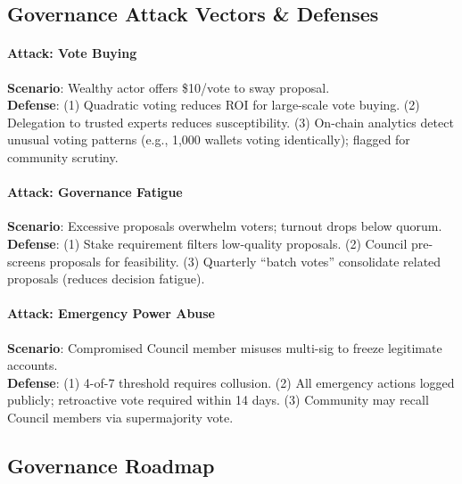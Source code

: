 \documentclass[11pt]{article}
\begin{document}
\begin{itemize}[noitemsep]
\begin{itemize}[noitemsep]
\begin{itemize}[noitemsep]
\begin{itemize}[noitemsep]
\begin{itemize}[noitemsep]
\subsection{Governance Attack Vectors \& Defenses}

\paragraph{Attack: Vote Buying}
\textbf{Scenario}: Wealthy actor offers \$10/vote to sway proposal.\\
\textbf{Defense}: (1) Quadratic voting reduces ROI for large-scale vote buying. (2) Delegation to trusted experts reduces susceptibility. (3) On-chain analytics detect unusual voting patterns (e.g., 1,000 wallets voting identically); flagged for community scrutiny.

\paragraph{Attack: Governance Fatigue}
\textbf{Scenario}: Excessive proposals overwhelm voters; turnout drops below quorum.\\
\textbf{Defense}: (1) Stake requirement filters low-quality proposals. (2) Council pre-screens proposals for feasibility. (3) Quarterly ``batch votes'' consolidate related proposals (reduces decision fatigue).

\paragraph{Attack: Emergency Power Abuse}
\textbf{Scenario}: Compromised Council member misuses multi-sig to freeze legitimate accounts.\\
\textbf{Defense}: (1) 4-of-7 threshold requires collusion. (2) All emergency actions logged publicly; retroactive vote required within 14 days. (3) Community may recall Council members via supermajority vote.

\subsection{Governance Roadmap}


\end{itemize}
\end{itemize}
\end{itemize}
\end{itemize}
\end{itemize}
\end{document}
